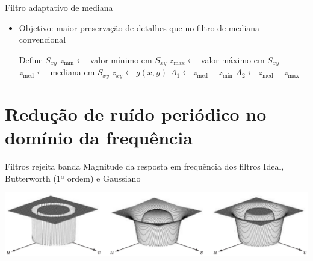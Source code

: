 \begin{slide}{Filtro adaptativo de mediana}
	\begin{itemize}
		\item Objetivo: maior preservação de detalhes que no filtro de mediana convencional
			\footnotesize{
			\begin{algorithm}[H]
				\DontPrintSemicolon
				\BlankLine
				Define $S_{xy}$\;\label{ret}
				$z_\text{min} \leftarrow $ valor mínimo em $S_{xy}$\;
				$z_\text{max} \leftarrow  $ valor máximo em $S_{xy}$\;
				$z_\text{med} \leftarrow $ mediana em $S_{xy}$\;
				$z_{xy} \leftarrow g(x,y)$\;
				\BlankLine
				$A_1 \leftarrow z_\text{med} - z_\text{min}$\;
				$A_2 \leftarrow z_\text{med} - z_\text{max}$\;

					
				
				\caption{\footnotesize Filtragem adaptativa de mediana}
			\end{algorithm}}
	\end{itemize}
\end{slide}

\section[ slide = true]{Redução de ruído periódico no domínio da frequência}
\begin{slide}{Filtros rejeita banda}
	Magnitude da resposta em frequência dos filtros Ideal, Butterworth (1ª ordem) e Gaussiano
	\begin{center}
		\includegraphics[width = \textwidth]{figs/5-15}
	\end{center}
\end{slide}

